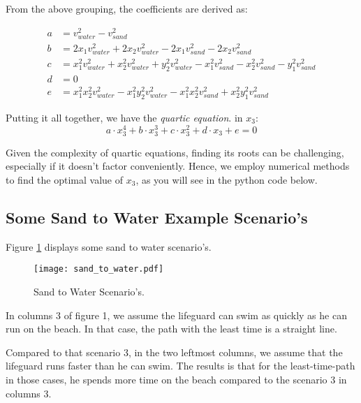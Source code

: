 \documentclass[11pt, a4paper]{article}
\begin{document}
From the above grouping, the coefficients are derived as:

\begin{align*}
a & = v_{water}^2 - v_{sand}^2 \\
b & = 2x_1v_{water}^2 + 2x_2v_{water}^2 - 2x_1v_{sand}^2 - 2x_2v_{sand}^2 \\
c & = x_1^2v_{water}^2 + x_2^2v_{water}^2 + y_2^2v_{water}^2 - x_1^2v_{sand}^2 - x_2^2v_{sand}^2 - y_1^2v_{sand}^2 \\
d & = 0 \\
e & = x_1^2x_2^2v_{water}^2 - x_1^2y_2^2v_{water}^2 - x_1^2x_2^2v_{sand}^2 + x_2^2y_1^2v_{sand}^2
\end{align*}

Putting it all together, we have the \emph{quartic equation}. in \( x_3 \):
\[ a \cdot x_3^4 + b \cdot x_3^3 + c \cdot x_3^2 + d \cdot x_3 + e = 0 \]

Given the complexity of quartic equations, finding its roots can be challenging,
especially if it doesn't factor conveniently.
Hence, we employ numerical methods to find the optimal value of \( x_3 \), as you will see in the python code below.

\subsection{Some Sand to Water Example Scenario's}

Figure \ref{fig:sand_to_water} displays some sand to water scenario's.

\begin{figure}[htbp] %
    \centering %
    \texttt{[image: sand\_to\_water.pdf]} %
    \caption{Sand to Water Scenario's.} %
    \label{fig:sand_to_water} %
\end{figure}

In columns 3 of figure 1, we assume the lifeguard can swim as quickly as he can run on the beach.
In that case, the path with the least time is a straight line.

Compared to that scenario 3, in the two leftmost columns, we assume that the lifeguard runs faster than he can swim.
The results is that for the least-time-path in those cases, he spends more time on the beach
compared to the scenario 3 in columns 3.
\end{document}
